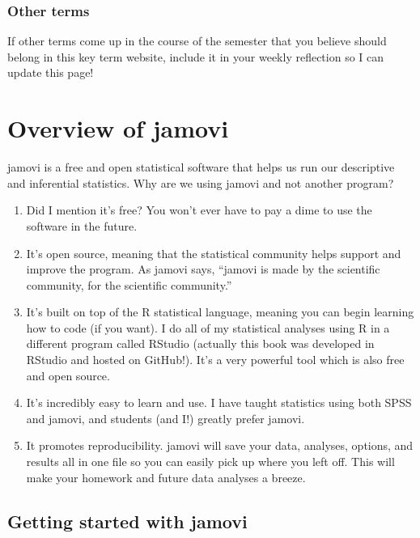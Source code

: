 \documentclass[
]{book}
\begin{document}
\hypertarget{other-terms}{%
\subsection{Other terms}\label{other-terms}}

If other terms come up in the course of the semester that you believe should belong in this key term website, include it in your weekly reflection so I can update this page!

\hypertarget{overview-of-jamovi}{%
\chapter{Overview of jamovi}\label{overview-of-jamovi}}

jamovi is a free and open statistical software that helps us run our descriptive and inferential statistics. Why are we using jamovi and not another program?

\begin{enumerate}
\def\labelenumi{\arabic{enumi}.}
\item
  Did I mention it's free? You won't ever have to pay a dime to use the software in the future.
\item
  It's open source, meaning that the statistical community helps support and improve the program. As jamovi says, ``jamovi is made by the scientific community, for the scientific community.''
\item
  It's built on top of the R statistical language, meaning you can begin learning how to code (if you want). I do all of my statistical analyses using R in a different program called RStudio (actually this book was developed in RStudio and hosted on GitHub!). It's a very powerful tool which is also free and open source.
\item
  It's incredibly easy to learn and use. I have taught statistics using both SPSS and jamovi, and students (and I!) greatly prefer jamovi.
\item
  It promotes reproducibility. jamovi will save your data, analyses, options, and results all in one file so you can easily pick up where you left off. This will make your homework and future data analyses a breeze.
\end{enumerate}

\hypertarget{getting-started-with-jamovi}{%
\section{Getting started with jamovi}\label{getting-started-with-jamovi}}
\end{document}

